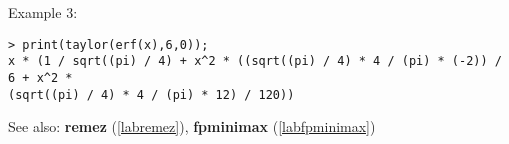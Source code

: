 \noindent Example 3: 
\begin{center}\begin{minipage}{15cm}\begin{Verbatim}[frame=single]
> print(taylor(erf(x),6,0));
x * (1 / sqrt((pi) / 4) + x^2 * ((sqrt((pi) / 4) * 4 / (pi) * (-2)) / 6 + x^2 * 
(sqrt((pi) / 4) * 4 / (pi) * 12) / 120))
\end{Verbatim}
\end{minipage}\end{center}
See also: \textbf{remez} (\ref{labremez}), \textbf{fpminimax} (\ref{labfpminimax})
